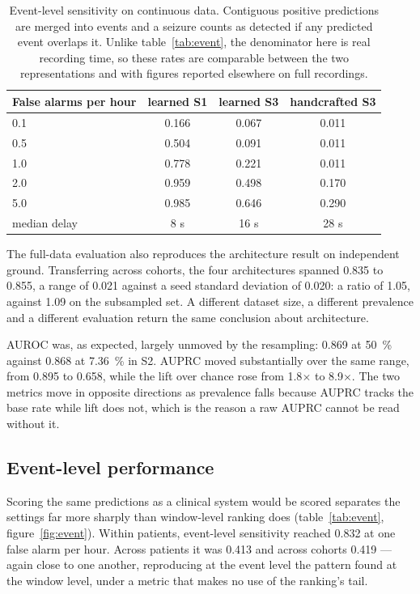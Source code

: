 \documentclass[11pt,a4paper]{article}
\begin{document}
\begin{table}[t]
\centering\small
\caption{Event-level sensitivity on continuous data. Contiguous positive
predictions are merged into events and a seizure counts as detected if any
predicted event overlaps it. Unlike table~\ref{tab:event}, the denominator
here is real recording time, so these rates are comparable between the two
representations and with figures reported elsewhere on full recordings.}
\label{tab:eventnative}
\begin{tabular}{lccc}
\toprule
False alarms per hour & learned S1 & learned S3 & handcrafted S3 \\
\midrule
0.1 & 0.166 & 0.067 & 0.011 \\
0.5 & 0.504 & 0.091 & 0.011 \\
1.0 & 0.778 & 0.221 & 0.011 \\
2.0 & 0.959 & 0.498 & 0.170 \\
5.0 & 0.985 & 0.646 & 0.290 \\
\addlinespace
median delay & 8 s & 16 s & 28 s \\
\bottomrule
\end{tabular}
\end{table}

The full-data evaluation also reproduces the architecture result on
independent ground. Transferring across cohorts, the four architectures
spanned 0.835 to 0.855, a range of 0.021 against a seed standard deviation
of 0.020: a ratio of 1.05, against 1.09 on the subsampled set. A different
dataset size, a different prevalence and a different evaluation return the
same conclusion about architecture.

AUROC was, as expected, largely unmoved by the resampling: 0.869 at
\SI{50}{\percent} against 0.868 at \SI{7.36}{\percent} in S2. AUPRC moved
substantially over the same range, from 0.895 to 0.658, while the lift over
chance rose from 1.8$\times$ to 8.9$\times$. The two metrics move in opposite
directions as prevalence falls because AUPRC tracks the base rate while lift
does not, which is the reason a raw AUPRC cannot be read without it.

\subsection{Event-level performance}

Scoring the same predictions as a clinical system would be scored separates
the settings far more sharply than window-level ranking does
(table~\ref{tab:event}, figure~\ref{fig:event}). Within patients,
event-level sensitivity reached 0.832 at one false alarm per hour. Across
patients it was 0.413 and across cohorts 0.419 --- again close to one
another, reproducing at the event level the pattern found at the window
level, under a metric that makes no use of the ranking's tail.
\end{document}
